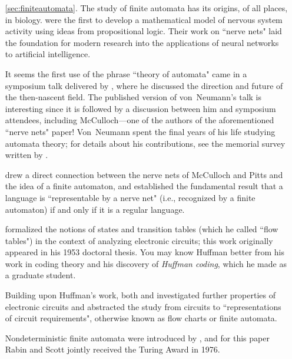 \begin{enumerate}
\item[\ref{sec:finiteautomata}.] The study of finite automata has its origins, of all places, in biology. \citet{McCullochPitts1943LogicalCalculus} were the first to develop a mathematical model of nervous system activity using ideas from propositional logic. Their work on ``nerve nets" laid the foundation for modern research into the applications of neural networks to artificial intelligence.

It seems the first use of the phrase ``theory of automata" came in a symposium talk delivered by \citet{VonNeumann1951GeneralLogicalTheoryAutomata}, where he discussed the direction and future of the then-nascent field. The published version of von~Neumann's talk is interesting since it is followed by a discussion between him and symposium attendees, including McCulloch---one of the authors of the aforementioned ``nerve nets" paper! Von~Neumann spent the final years of his life studying automata theory; for details about his contributions, see the memorial survey written by \citet{Shannon1958VonNeumannAutomataTheory}.

\citet{Kleene1951RepresentationEvents, Kleene1956RepresentationEvents} drew a direct connection between the nerve nets of McCulloch and Pitts and the idea of a finite automaton, and established the fundamental result that a language is ``representable by a nerve net" (i.e., recognized by a finite automaton) if and only if it is a regular language.

\citet{Huffman1954SynthesisSwitchingCircuits, Huffman1954SynthesisSwitchingCircuitsPart2} formalized the notions of states and transition tables (which he called ``flow tables") in the context of analyzing electronic circuits; this work originally appeared in his 1953 doctoral thesis. You may know Huffman better from his work in coding theory and his discovery of \emph{Huffman coding}, which he made as a graduate student.

Building upon Huffman's work, both \citet{Mealy1955MethodSynthesizingCircuits} and \citet{Moore1956GedankenExperiments} investigated further properties of electronic circuits and abstracted the study from circuits to ``representations of circuit requirements", otherwise known as flow charts or finite automata.

Nondeterministic finite automata were introduced by \citet{RabinScott1959FiniteAutomata}, and for this paper Rabin and Scott jointly received the Turing Award in 1976.


\end{enumerate}
